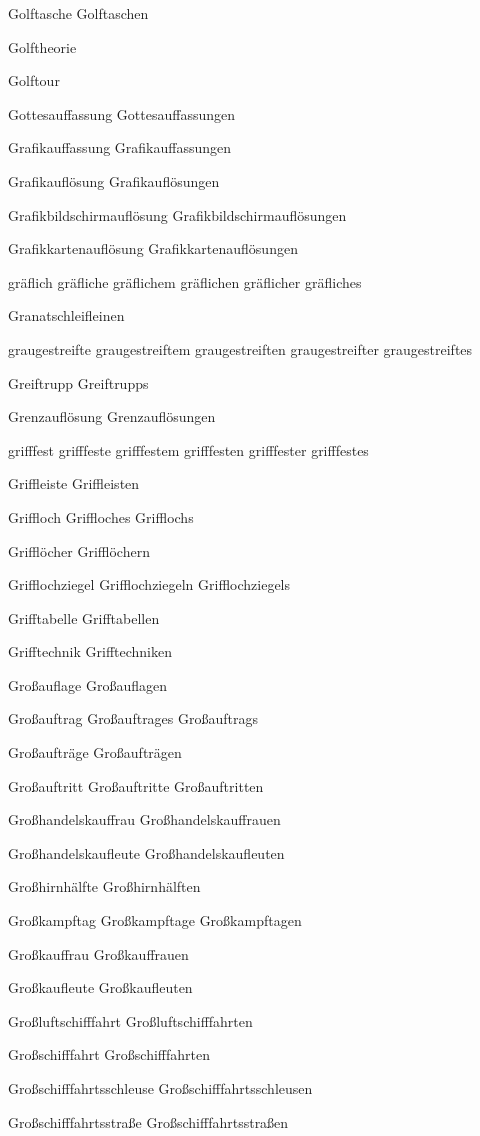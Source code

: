 Golftasche
Golftaschen

Golftheorie

Golftour

Gottesauffassung
Gottesauffassungen

Grafikauffassung
Grafikauffassungen

Grafikauflösung
Grafikauflösungen

Grafikbildschirmauflösung
Grafikbildschirmauflösungen

Grafikkartenauflösung
Grafikkartenauflösungen

gräflich
gräfliche
gräflichem
gräflichen
gräflicher
gräfliches

Granatschleifleinen

graugestreifte
graugestreiftem
graugestreiften
graugestreifter
graugestreiftes

Greiftrupp
Greiftrupps

Grenzauflösung
Grenzauflösungen

grifffest
grifffeste
grifffestem
grifffesten
grifffester
grifffestes

Griffleiste
Griffleisten

Griffloch
Griffloches
Grifflochs

Grifflöcher
Grifflöchern

Grifflochziegel
Grifflochziegeln
Grifflochziegels

Grifftabelle
Grifftabellen

Grifftechnik
Grifftechniken

Großauflage
Großauflagen

Großauftrag
Großauftrages
Großauftrags

Großaufträge
Großaufträgen

Großauftritt
Großauftritte
Großauftritten

Großhandelskauffrau
Großhandelskauffrauen

Großhandelskaufleute
Großhandelskaufleuten

Großhirnhälfte
Großhirnhälften

Großkampftag
Großkampftage
Großkampftagen

Großkauffrau
Großkauffrauen

Großkaufleute
Großkaufleuten

Großluftschifffahrt
Großluftschifffahrten

Großschifffahrt
Großschifffahrten

Großschifffahrtsschleuse
Großschifffahrtsschleusen

Großschifffahrtsstraße
Großschifffahrtsstraßen

